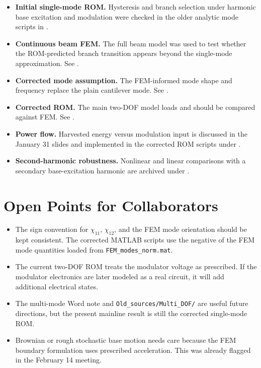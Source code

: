 \documentclass[11pt]{article}
\begin{document}
\begin{itemize}
  \item \textbf{Initial single-mode ROM.}  Hysteresis and branch selection under
  harmonic base excitation and modulation were checked in the older analytic
  mode scripts in .
  \item \textbf{Continuous beam FEM.}  The full beam model was used to test
  whether the ROM-predicted branch transition appears beyond the single-mode
  approximation.  See .
  \item \textbf{Corrected mode assumption.}  The FEM-informed mode shape and
  frequency replace the plain cantilever mode.  See
  .
  \item \textbf{Corrected ROM.}  The main two-DOF model loads
   and should be compared against FEM.  See
  .
  \item \textbf{Power flow.}  Harvested energy versus modulation input is
  discussed in the January 31 slides and implemented in the corrected ROM
  scripts under .
  \item \textbf{Second-harmonic robustness.}  Nonlinear and linear comparisons
  with a secondary base-excitation harmonic are archived under
  .
\end{itemize}

\section{Open Points for Collaborators}

\begin{itemize}
  \item The sign convention for $\chi_{11}$, $\chi_{12}$, and the FEM mode
  orientation should be kept consistent.  The corrected MATLAB scripts use the
  negative of the FEM mode quantities loaded from \texttt{FEM\_modes\_norm.mat}.
  \item The current two-DOF ROM treats the modulator voltage as prescribed.  If
  the modulator electronics are later modeled as a real circuit, it will add
  additional electrical states.
  \item The multi-mode Word note and \texttt{Old\_sources/Multi\_DOF/} are
  useful future directions, but the present mainline result is still the
  corrected single-mode ROM.
  \item Brownian or rough stochastic base motion needs care because the FEM
  boundary formulation uses prescribed acceleration.  This was already flagged
  in the February 14 meeting.
\end{itemize}
\end{document}
